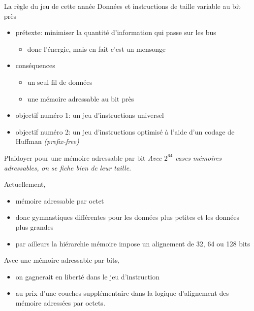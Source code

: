 \documentclass[slidetop,11pt,table]{beamer}
\begin{document}
\begin{frame}{La règle du jeu de cette année}
  Données et instructions de taille variable au bit près
  \begin{itemize}
  \item prétexte: minimiser la quantité d'information qui passe sur les bus
    \begin{itemize}
    \item donc l'énergie, mais en fait c'est un mensonge
    \end{itemize}
  \item conséquences
    \begin{itemize}
    \item un seul fil de données
    \item une mémoire adressable au bit près
    \end{itemize}
  \item objectif numéro 1: un jeu d'instructions universel
  \item objectif numéro 2: un jeu d'instructions optimisé à l'aide d'un codage de Huffman {\it (prefix-free)}
  \end{itemize}
\end{frame}



\begin{frame}{Plaidoyer pour une mémoire adressable par bit}
  \emph{Avec $2^{64}$  cases mémoires adressables, on se fiche bien de leur taille.}

  \vfill
  Actuellement,
  \begin{itemize}
  \item mémoire adressable par octet
  \item donc gymnastiques différentes pour les données plus petites et les données plus grandes
  \item par ailleurs la hiérarchie mémoire impose un alignement de 32, 64 ou 128 bits 
  \end{itemize}

  Avec une mémoire adressable par bits,
  \begin{itemize}
  \item on gagnerait en liberté dans le jeu d'instruction
  \item au prix d'une couches supplémentaire dans la logique d'alignement des mémoire adressées par octets.
  \end{itemize}
\end{frame}
\end{document}
